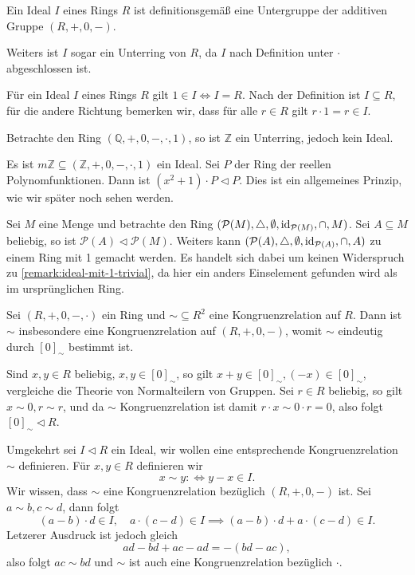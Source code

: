 \begin{remark}
    Ein Ideal $I$ eines Rings $R$ ist definitionsgemäß eine Untergruppe der additiven Gruppe $(R, +, 0, -)$.

    Weiters ist $I$ sogar ein Unterring von $R$, da $I$ nach Definition unter $\cdot$ abgeschlossen ist.
\end{remark}

\begin{remark}\label{remark:ideal-mit-1-trivial}
    Für ein Ideal $I$ eines Rings $R$ gilt $1 \in I \Leftrightarrow I = R$. Nach der Definition ist $I \subseteq R$, für die andere Richtung bemerken wir, dass für alle $r \in R$ gilt $r \cdot 1 = r \in I$.
\end{remark}

\begin{example}
    Betrachte den Ring $(\mathbb{Q}, +, 0, -, \cdot, 1)$, so ist $\mathbb{Z}$ ein Unterring, jedoch kein Ideal.
\end{example}

\begin{example}
    Es ist $m \mathbb{Z} \subseteq (\mathbb{Z}, +, 0, -, \cdot, 1)$ ein Ideal. Sei $P$ der Ring der reellen Polynomfunktionen. Dann ist $(x^2 + 1) \cdot P \vartriangleleft P$. Dies ist ein allgemeines Prinzip, wie wir später noch sehen werden.

    Sei $M$ eine Menge und betrachte den Ring $(\mathcal{P}(M), \triangle, \emptyset, \operatorname{id}_{\mathcal{P}(M)}, \cap, M)$. Sei $A \subseteq M$ beliebig, so ist $\mathcal{P}(A) \vartriangleleft \mathcal{P}(M)$. Weiters kann $(\mathcal{P}(A), \triangle, \emptyset, \operatorname{id}_{\mathcal{P}(A)}, \cap, A)$ zu einem Ring mit 1 gemacht werden. Es handelt sich dabei um keinen Widerspruch zu \cref{remark:ideal-mit-1-trivial}, da hier ein anders Einselement gefunden wird als im ursprünglichen Ring.
\end{example}

\begin{remark}\label{remark:ideal-congrel}
    Sei $(R, +, 0, -, \cdot)$ ein Ring und $\sim \subseteq R^2$ eine Kongruenzrelation auf $R$. Dann ist $\sim$ insbesondere eine Kongruenzrelation auf $(R, +, 0, -)$, womit $\sim$ eindeutig durch $[0]_{\sim}$ bestimmt ist.

    Sind $x, y \in R$ beliebig, $x, y \in [0]_{\sim}$, so gilt $x + y \in [0]_{\sim}, (-x) \in [0]_{\sim}$, vergleiche die Theorie von Normalteilern von Gruppen. Sei $r \in R$ beliebig, so gilt $x \sim 0, r \sim r$, und da $\sim$ Kongruenzrelation ist damit $r \cdot x \sim 0 \cdot r = 0$, also folgt $[0]_{\sim} \vartriangleleft R$.

    Umgekehrt sei $I \vartriangleleft R$ ein Ideal, wir wollen eine entsprechende Kongruenzrelation $\sim$ definieren. Für $x, y \in R$ definieren wir
    $$ x \sim y :\Leftrightarrow y - x \in I. $$
    Wir wissen, dass $\sim$ eine Kongruenzrelation bezüglich $(R, +, 0, -)$ ist. Sei $a \sim b, c \sim d$, dann folgt
    $$ (a-b) \cdot d \in I, \quad a \cdot (c - d) \in I \implies (a-b)\cdot d + a\cdot(c-d) \in I. $$
    Letzerer Ausdruck ist jedoch gleich
    $$ ad - bd + ac - ad = -(bd - ac), $$
    also folgt $ac \sim bd$ und $\sim$ ist auch eine Kongruenzrelation bezüglich $\cdot$.
\end{remark}

